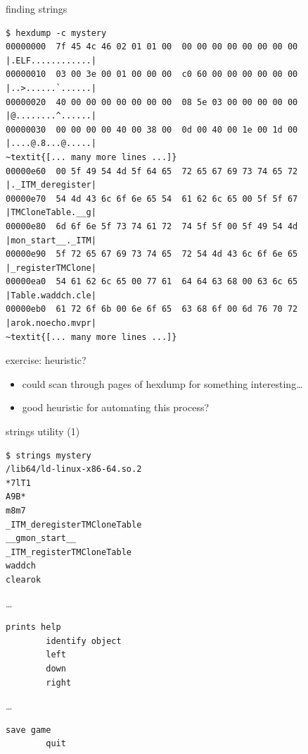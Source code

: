 \begin{frame}[fragile]{finding strings}
\begin{Verbatim}[commandchars=~\{\},fontsize=\fontsize{9}{10}]
$ hexdump -c mystery
00000000  7f 45 4c 46 02 01 01 00  00 00 00 00 00 00 00 00  |.ELF............|
00000010  03 00 3e 00 01 00 00 00  c0 60 00 00 00 00 00 00  |..>......`......|
00000020  40 00 00 00 00 00 00 00  08 5e 03 00 00 00 00 00  |@........^......|
00000030  00 00 00 00 40 00 38 00  0d 00 40 00 1e 00 1d 00  |....@.8...@.....|
~textit{[... many more lines ...]}
00000e60  00 5f 49 54 4d 5f 64 65  72 65 67 69 73 74 65 72  |._ITM_deregister|
00000e70  54 4d 43 6c 6f 6e 65 54  61 62 6c 65 00 5f 5f 67  |TMCloneTable.__g|
00000e80  6d 6f 6e 5f 73 74 61 72  74 5f 5f 00 5f 49 54 4d  |mon_start__._ITM|
00000e90  5f 72 65 67 69 73 74 65  72 54 4d 43 6c 6f 6e 65  |_registerTMClone|
00000ea0  54 61 62 6c 65 00 77 61  64 64 63 68 00 63 6c 65  |Table.waddch.cle|
00000eb0  61 72 6f 6b 00 6e 6f 65  63 68 6f 00 6d 76 70 72  |arok.noecho.mvpr|
~textit{[... many more lines ...]}
\end{Verbatim}
\end{frame}

\begin{frame}{exercise: heuristic?}
    \begin{itemize}
    \item could scan through pages of hexdump for something interesting\ldots
    \vspace{.5cm}
    \item good heuristic for automating this process?
    \end{itemize}
\end{frame}

\begin{frame}[fragile]{strings utility (1)}
\begin{Verbatim}[fontsize=\fontsize{9}{10}]
$ strings mystery
/lib64/ld-linux-x86-64.so.2
*7lT1
A9B*
m8m7
_ITM_deregisterTMCloneTable
__gmon_start__
_ITM_registerTMCloneTable
waddch
clearok
\end{Verbatim}
\vspace{-1em}
\ldots
\begin{Verbatim}[fontsize=\fontsize{9}{10}]
        prints help
        identify object
        left
        down
        right
\end{Verbatim}
\vspace{-1em}
\ldots
\begin{Verbatim}[fontsize=\fontsize{9}{10}]
        save game
        quit
\end{Verbatim}
\end{frame}

